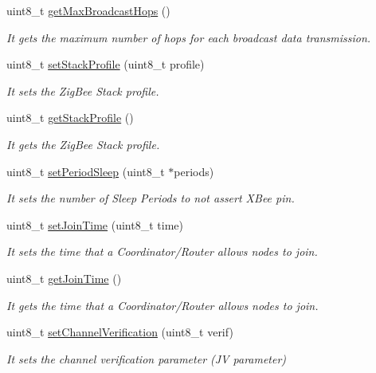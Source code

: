 \begin{DoxyCompactItemize}
uint8\+\_\+t \hyperlink{class_wasp_x_bee_z_b_a7e85b32a0d105071a2e7eff27628d946}{get\+Max\+Broadcast\+Hops} ()
\begin{DoxyCompactList}\small\item\em It gets the maximum number of hops for each broadcast data transmission. \end{DoxyCompactList}\item 
uint8\+\_\+t \hyperlink{class_wasp_x_bee_z_b_a245b1892e4d6d660a964ca0a5b0039f1}{set\+Stack\+Profile} (uint8\+\_\+t profile)
\begin{DoxyCompactList}\small\item\em It sets the Zig\+Bee Stack profile. \end{DoxyCompactList}\item 
uint8\+\_\+t \hyperlink{class_wasp_x_bee_z_b_a222859bf9780dfde21a495b9c6663fb9}{get\+Stack\+Profile} ()
\begin{DoxyCompactList}\small\item\em It gets the Zig\+Bee Stack profile. \end{DoxyCompactList}\item 
uint8\+\_\+t \hyperlink{class_wasp_x_bee_z_b_ae15b1c90c2d6177ad73584ff2cd1000c}{set\+Period\+Sleep} (uint8\+\_\+t $\ast$periods)
\begin{DoxyCompactList}\small\item\em It sets the number of Sleep Periods to not assert X\+Bee pin. \end{DoxyCompactList}\item 
uint8\+\_\+t \hyperlink{class_wasp_x_bee_z_b_a153775deeb7794798e78625afa1cca79}{set\+Join\+Time} (uint8\+\_\+t time)
\begin{DoxyCompactList}\small\item\em It sets the time that a Coordinator/\+Router allows nodes to join. \end{DoxyCompactList}\item 
uint8\+\_\+t \hyperlink{class_wasp_x_bee_z_b_a9ca694d7fc105ef037073c6637daaf4e}{get\+Join\+Time} ()
\begin{DoxyCompactList}\small\item\em It gets the time that a Coordinator/\+Router allows nodes to join. \end{DoxyCompactList}\item 
uint8\+\_\+t \hyperlink{class_wasp_x_bee_z_b_ab6a35d342a298d95fc01740f5441b209}{set\+Channel\+Verification} (uint8\+\_\+t verif)
\begin{DoxyCompactList}\small\item\em It sets the channel verification parameter (JV parameter) \end{DoxyCompactList}\item 

\end{DoxyCompactItemize}
